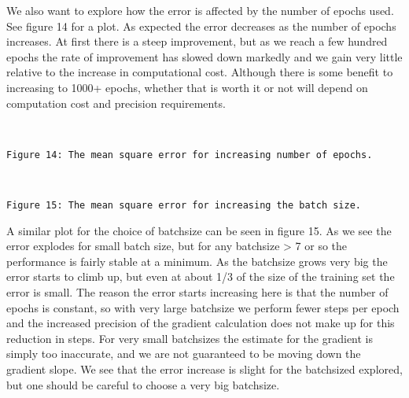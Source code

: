 \documentclass[11pt]{article}
\begin{document}
We also want to explore how the error is affected by the number of
epochs used. See figure 14 for a plot. As expected the error decreases
as the number of epochs increases. At first there is a steep
improvement, but as we reach a few hundred epochs the rate of
improvement has slowed down markedly and we gain very little relative to
the increase in computational cost. Although there is some benefit to
increasing to 1000+ epochs, whether that is worth it or not will depend
on computation cost and precision requirements.

    \begin{center}
    \end{center}
    { \hspace*{\fill} \\}
    
    \begin{Verbatim}[commandchars=\\\{\}]
Figure 14: The mean square error for increasing number of epochs.
    \end{Verbatim}

    \begin{center}
    \end{center}
    { \hspace*{\fill} \\}
    
    \begin{Verbatim}[commandchars=\\\{\}]
Figure 15: The mean square error for increasing the batch size.
    \end{Verbatim}

    A similar plot for the choice of batchsize can be seen in figure 15. As
we see the error explodes for small batch size, but for any batchsize
\textgreater{} 7 or so the performance is fairly stable at a minimum. As
the batchsize grows very big the error starts to climb up, but even at
about 1/3 of the size of the training set the error is small. The reason
the error starts increasing here is that the number of epochs is
constant, so with very large batchsize we perform fewer steps per epoch
and the increased precision of the gradient calculation does not make up
for this reduction in steps. For very small batchsizes the estimate for
the gradient is simply too inaccurate, and we are not guaranteed to be
moving down the gradient slope. We see that the error increase is slight
for the batchsized explored, but one should be careful to choose a very
big batchsize.
\end{document}
